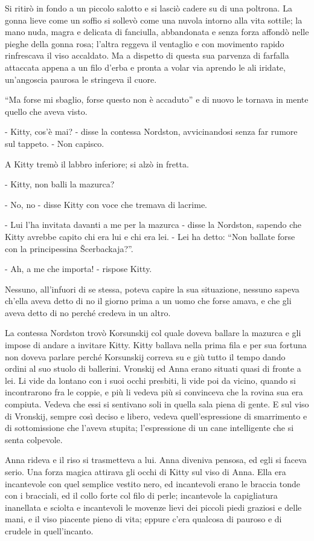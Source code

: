 Si ritirò in fondo a un piccolo salotto e si lasciò cadere su di una poltrona. La gonna lieve come un soffio si sollevò come una nuvola intorno alla vita sottile; la mano nuda, magra e delicata di fanciulla, abbandonata e senza forza affondò nelle pieghe della gonna rosa; l'altra reggeva il ventaglio e con movimento rapido rinfrescava il viso accaldato. Ma a dispetto di questa sua parvenza di farfalla attaccata appena a un filo d'erba e pronta a volar via aprendo le ali iridate, un'angoscia paurosa le stringeva il cuore. 

``Ma forse mi sbaglio, forse questo non è accaduto'' e di nuovo le tornava in mente quello che aveva visto. 

- Kitty, cos'è mai? - disse la contessa Nordston, avvicinandosi senza far rumore sul tappeto. - Non capisco. 

A Kitty tremò il labbro inferiore; si alzò in fretta. 

- Kitty, non balli la mazurca? 

- No, no - disse Kitty con voce che tremava di lacrime. 

- Lui l'ha invitata davanti a me per la mazurca - disse la Nordston, sapendo che Kitty avrebbe capito chi era lui e chi era lei. - Lei ha detto: ``Non ballate forse con la principessina Šcerbackaja?''. 

- Ah, a me che importa! - rispose Kitty. 

Nessuno, all'infuori di se stessa, poteva capire la sua situazione, nessuno sapeva ch'ella aveva detto di no il giorno prima a un uomo che forse amava, e che gli aveva detto di no perché credeva in un altro. 

La contessa Nordston trovò Korsunskij col quale doveva ballare la mazurca e gli impose di andare a invitare Kitty. Kitty ballava nella prima fila e per sua fortuna non doveva parlare perché Korsunskij correva su e giù tutto il tempo dando ordini al suo stuolo di ballerini. Vronskij ed Anna erano situati quasi di fronte a lei. Li vide da lontano con i suoi occhi presbiti, li vide poi da vicino, quando si incontrarono fra le coppie, e più li vedeva più si convinceva che la rovina sua era compiuta. Vedeva che essi si sentivano soli in quella sala piena di gente. E sul viso di Vronskij, sempre così deciso e libero, vedeva quell'espressione di smarrimento e di sottomissione che l'aveva stupita; l'espressione di un cane intelligente che si senta colpevole. 

Anna rideva e il riso si trasmetteva a lui. Anna diveniva pensosa, ed egli si faceva serio. Una forza magica attirava gli occhi di Kitty sul viso di Anna. Ella era incantevole con quel semplice vestito nero, ed incantevoli erano le braccia tonde con i bracciali, ed il collo forte col filo di perle; incantevole la capigliatura inanellata e sciolta e incantevoli le movenze lievi dei piccoli piedi graziosi e delle mani, e il viso piacente pieno di vita; eppure c'era qualcosa di pauroso e di crudele in quell'incanto. 

